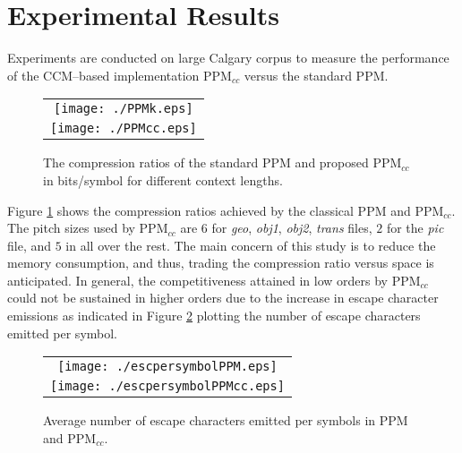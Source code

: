 \documentclass[runningheads,a4paper]{llncs}
\begin{document}
\section{Experimental Results}

Experiments are conducted on large Calgary corpus to measure the performance of the CCM--based
implementation PPM$_{cc}$ versus the standard PPM. 

\begin{figure}
  \begin{center}
 \begin{tabular}{c}
 \texttt{[image: ./PPMk.eps]}
\\
 \texttt{[image: ./PPMcc.eps]}
\end{tabular}
\end{center}
\caption{The compression ratios of the standard PPM and proposed PPM$_{cc}$ in bits/symbol for different context
lengths.}
\label{fig:compratio}
\end{figure} 

Figure \ref{fig:compratio} shows the compression ratios achieved by the classical PPM and PPM$_{cc}$. The pitch
sizes  used by PPM$_{cc}$ are $6$ for  \emph{geo}, \emph{obj1}, \emph{obj2}, \emph{trans} files, $2$ for the \emph{pic}
file, and $5$ in all over the rest.
The main concern of this study is to reduce the memory consumption, and thus, trading the compression ratio versus space
is anticipated. 
In general, the competitiveness attained in low orders by PPM$_{cc}$ could not be sustained  in  higher orders due to
the increase in escape character emissions as indicated in Figure \ref{fig:esc} plotting the number of escape characters
emitted per symbol.

\begin{figure}
  \begin{center}
 \begin{tabular}{c}
 \texttt{[image: ./escpersymbolPPM.eps]}
\\
 \texttt{[image: ./escpersymbolPPMcc.eps]}
\end{tabular}
\end{center}
\caption{Average number of escape characters emitted per symbols in PPM and PPM$_{cc}$.}
\label{fig:esc}
\end{figure} 
\end{document}
